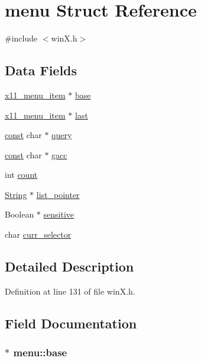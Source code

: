 \hypertarget{structmenu}{\section{menu Struct Reference}
\label{structmenu}
}


{\ttfamily \#include $<$win\+X.\+h$>$}

\subsection*{Data Fields}
\begin{DoxyCompactItemize}
\item 
\hyperlink{winX_8h_a68b552d87ad793cc9e71769eacb577dd}{x11\+\_\+menu\+\_\+item} $\ast$ \hyperlink{structmenu_a30450aa383e44be5f35d09029718688c}{base}
\item 
\hyperlink{winX_8h_a68b552d87ad793cc9e71769eacb577dd}{x11\+\_\+menu\+\_\+item} $\ast$ \hyperlink{structmenu_aab6cdb5421f24c19a73e839de8351228}{last}
\item 
\hyperlink{tradstdc_8h_a2c212835823e3c54a8ab6d95c652660e}{const} char $\ast$ \hyperlink{structmenu_a2efbe98465e0876eb876ec9c17646bae}{query}
\item 
\hyperlink{tradstdc_8h_a2c212835823e3c54a8ab6d95c652660e}{const} char $\ast$ \hyperlink{structmenu_add1624fb9ee5a8b54a7c409af24d0318}{gacc}
\item 
int \hyperlink{structmenu_a3d6c8d06c1b134f60244b4449a094d16}{count}
\item 
\hyperlink{winreq_8c_a390a5f3d86203009670d84592ac44102}{String} $\ast$ \hyperlink{structmenu_a2178029afde307157f89e6a2fc454636}{list\+\_\+pointer}
\item 
Boolean $\ast$ \hyperlink{structmenu_aa5c38839b8f6012c50835704a25d7f26}{sensitive}
\item 
char \hyperlink{structmenu_a06cdb274941f7ed31c60fc8e8389cd6b}{curr\+\_\+selector}
\end{DoxyCompactItemize}


\subsection{Detailed Description}


Definition at line 131 of file win\+X.\+h.



\subsection{Field Documentation}
\hypertarget{structmenu_a30450aa383e44be5f35d09029718688c}{
\subsubsection[{base}]{$\ast$ menu\+::base}}\label{structmenu_a30450aa383e44be5f35d09029718688c}


